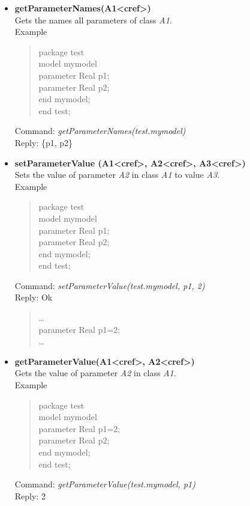 \documentclass[11pt,a4paper,oneside,english]{book}
\newenvironment{modelicaExamples}{\begin{itemize}}{\end{itemize}}
\newcommand{\api}[2]{\item \textbf{#1} \\ #2}
\newcommand{\tab}{\hspace{2em}}
\newcommand{\command}[1]{Command: \textit{#1}\\}
\newcommand{\reply}[1]{Reply: #1}
\newcommand{\functionex}[2]{\begin{singlespace} \command{#1} \reply{#2} \end{singlespace}}
\newcommand{\examples}{Example}
\newenvironment{mocode}{\begin{verse}\begin{singlespace}\begin{scriptsize}\ttfamily}{\end{scriptsize}\end{singlespace}\end{verse}}
\begin{document}
\begin{modelicaExamples}
{{			equation\\
			\tab connect(L.p,G.p) annotation(Line(points=\{\{-75.0,75.0\},\{-25.0,75.0\}\}, color= \{0, 0, 255\}));
			\dots
			}
		}

		\api{getParameterNames(A1<cref>)}{Gets the names all parameters of  class \textit{A1}.\\
		\examples
		\begin{mocode}
		package test\\
		\tab model mymodel\\
		\tab\tab parameter Real p1;\\
		\tab\tab parameter Real p2;\\
		\tab end mymodel;\\
		end test;\\
		\end{mocode}

		\functionex{getParameterNames(test.mymodel)}
		{\{p1, p2\}}
		}

		\api{setParameterValue (A1<cref>, A2<cref>, A3<cref>)}{Sets the value of parameter \textit{A2} in class \textit{A1} to value \textit{A3}.\\
		\examples
		\begin{mocode}
		package test \\
		\tab model mymodel\\
		\tab\tab parameter Real p1;\\
		\tab\tab parameter Real p2;\\
		\tab end mymodel;\\
		end test;\\
		\end{mocode}
		\functionex{setParameterValue(test.mymodel, p1, 2)}
		{Ok}

		\begin{mocode}
		\dots \\
		parameter Real p1=2;\\
		\dots \\
		\end{mocode}
		}

		\api{getParameterValue(A1<cref>, A2<cref>)}{Gets the value of parameter \textit{A2} in class \textit{A1}.\\
		\examples
		\begin{mocode}
		package test\\
		\tab model mymodel\\
		\tab\tab parameter Real p1=2;\\
		\tab\tab parameter Real p2;\\
		\tab end mymodel;\\
		end test;\\
		\end{mocode}
		\functionex{getParameterValue(test.mymodel, p1)}
		{2}

		}

	\end{modelicaExamples}
\end{document}

